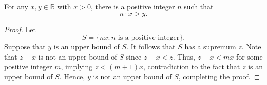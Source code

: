 \begin{theorem}
  For any $x, y \in \mathbb{R}$ with $x > 0$, there is a positive integer $n$
  such that
  \begin{equation*}
    n \cdot x > y.
  \end{equation*}
\end{theorem}
\begin{proof}
  Let
  \begin{equation*}
    S = \{nx : \text{$n$ is a positive integer}\}.
  \end{equation*}
  Suppose that $y$ is an upper bound of $S$.
  It follows that $S$ has a supremum $z$.
  Note that $z - x$ is not an upper bound of $S$ since $z - x < z$.
  Thus, $z - x < mx$ for some positive integer $m$, implying $z < (m + 1)x$,
  contradiction to the fact that $z$ is an upper bound of $S$.
  Hence, $y$ is not an upper bound of $S$, completing the proof.
\end{proof}